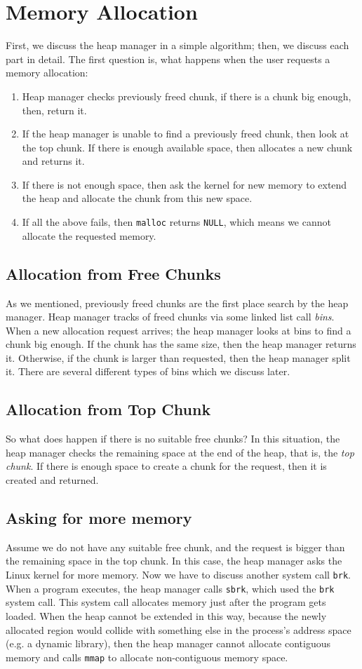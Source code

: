 \documentclass{masterthesis}
\newcommand*\mallocc{\lstinline{malloc}\xspace}
\newcommand*\mmapc{\lstinline{mmap}\xspace}
\newcommand*\sbrkc{\lstinline{sbrk}\xspace}
\newcommand*\brkc{\lstinline{brk}\xspace}
\begin{document}
\section{Memory Allocation}
 First, we discuss the heap manager in a simple algorithm; then, we discuss each part in detail. The first question is, what happens when the user requests a memory allocation:
\begin{enumerate}
	\item Heap manager checks previously freed chunk, if there is a chunk big enough, then, return it.
	\item If the heap manager is unable to find a previously freed chunk, then look at the top chunk. If there is enough available space, then allocates a new chunk and returns it.
	\item If there is not enough space, then ask the kernel for new memory to extend the heap and allocate the chunk from this new space.
	\item If all the above fails, then \mallocc{} returns \lstinline{NULL}, which means we cannot allocate the requested memory.
\end{enumerate}

\subsection{Allocation from Free Chunks}
As we mentioned, previously freed chunks are the first place search by the heap manager. Heap manager tracks of freed chunks via some linked list call \emph{bins}. When a new allocation request arrives; the heap manager looks at bins to find a chunk big enough. If the chunk has the same size, then the heap manager returns it. Otherwise, if the chunk is larger than requested, then the heap manager split it. There are several different types of bins which we discuss later.

\subsection{Allocation from Top Chunk}
So what does happen if there is no suitable free chunks? In this situation, the heap manager checks the remaining space at the end of the heap, that is, the \emph{top chunk}. If there is enough space to create a chunk for the request, then it is created and returned.

\subsection{Asking for more memory}
Assume we do not have any suitable free chunk, and the request is bigger than the remaining space in the top chunk. In this case, the heap manager asks the Linux kernel for more memory. Now we have to discuss another system call \brkc. When a program executes, the heap manager calls \sbrkc, which used the \brkc system call. This system call allocates memory just after the program gets loaded.
When the heap cannot be extended in this way, because the newly allocated region would collide with something else in the process's address space (e.g. a dynamic library), then the heap manager cannot allocate contiguous memory and calls \mmapc{} to allocate non-contiguous memory space.
\end{document}
